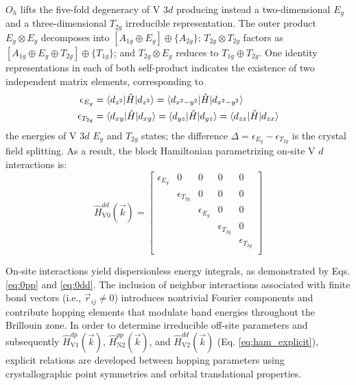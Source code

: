 \documentclass[twocolumn,showpacs,preprintnumbers,superscriptaddress,prb,floatfix,aps,10pt]{revtex4-1}
\newcommand*{\ham}{\hat{H}}
\begin{document}
$O_h$ lifts the five-fold degeneracy of V 3$d$ producing instead a two-dimensional $E_g$ and a three-dimensional $T_{2g}$ irreducible representation. The outer product $E_g \otimes E_g$ decomposes into $[A_{1g} \oplus E_g] \oplus \{A_{2g}\}$; $T_{2g} \otimes T_{2g}$ factors as $[A_{1g} \oplus E_{g} \oplus T_{2g}] \oplus \{T_{1g}\}$; and $T_{2g} \otimes E_g$ reduces to $T_{1g} \oplus T_{2g}$. One identity representations in each of both self-product indicates the existence of two independent matrix elements, corresponding to 
\begin{align}
\epsilon_{E_g} &
= \braket{d_{z^2}      | \ham | d_{z^2}} 
= \braket{d_{x^2-y^2}  | \ham | d_{x^2-y^2}  } \\
\epsilon_{T_{2g}} &
= \braket{d_{xy} | \ham | d_{xy} } 
= \braket{d_{yz} | \ham | d_{yz} }
= \braket{d_{zx} | \ham | d_{zx} }
\end{align}
the energies of V 3$d$ $E_g$ and $T_{2g}$ states; the difference $\Delta = \epsilon_{E_g} - \epsilon_{T_{2g}}$ is the crystal field splitting. As a result, the block Hamiltonian  parametrizing on-site V $d$ interactions is:
%
\begin{equation}
\label{eq:0dd}
\ham_{\textrm{V0}}^{dd}(\vec{k}) =
\begin{bmatrix}
 \epsilon_{E_g} & 0 & 0 & 0 & 0 \\
   & \epsilon_{T_{2g}} & 0 & 0 & 0 \\
   &   & \epsilon_{E_g} & 0 & 0 \\
   &   &   & \epsilon_{T_{2g}} & 0 \\
   &   &   &   & \epsilon_{T_{2g}} \\
\end{bmatrix}
\end{equation}

On-site interactions yield dispersionless energy integrals, as demonstrated by Eqs. \ref{eq:0pp} and \ref{eq:0dd}. The inclusion of neighbor interactions associated with finite bond vectors (i.e., $\vec{r}_{ij} \neq 0$) introduces nontrivial Fourier components and contribute hopping elements that modulate band energies throughout the Brillouin zone. In order to determine irreducible off-site parameters and subsequently $\ham_{\textrm{V}1}^{dp}(\vec{k})$, $\ham_{\textrm{N}2}^{pp}(\vec{k})$, and $\ham_{\textrm{V}2}^{dd}(\vec{k})$ (Eq. \ref{eq:ham_explicit}), explicit relations are developed between hopping parameters using crystallographic point symmetries and orbital translational properties. 
\end{document}
